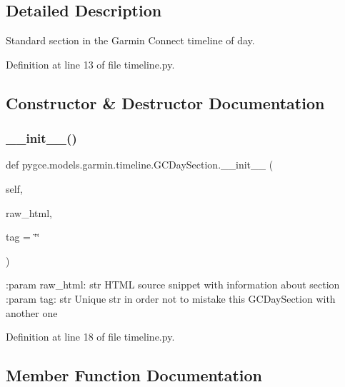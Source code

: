 \subsection{Detailed Description}
\begin{DoxyVerb}Standard section in the Garmin Connect timeline of day.
\end{DoxyVerb}
 

Definition at line 13 of file timeline.\+py.



\subsection{Constructor \& Destructor Documentation}
\mbox{\label{classpygce_1_1models_1_1garmin_1_1timeline_1_1_g_c_day_section_aae8c8c4a74381fa4ee47881ad498fb8f}} 
\subsubsection{\texorpdfstring{\+\_\+\+\_\+init\+\_\+\+\_\+()}{\_\_init\_\_()}}
{\footnotesize\ttfamily def pygce.\+models.\+garmin.\+timeline.\+G\+C\+Day\+Section.\+\_\+\+\_\+init\+\_\+\+\_\+ (\begin{DoxyParamCaption}\item[{}]{self,  }\item[{}]{raw\+\_\+html,  }\item[{}]{tag = {\ttfamily \char`\"{}\char`\"{}} }\end{DoxyParamCaption})}

\begin{DoxyVerb}:param raw_html: str
    HTML source snippet with information about section
:param tag: str
    Unique str in order not to mistake this GCDaySection with another one
\end{DoxyVerb}
 

Definition at line 18 of file timeline.\+py.



\subsection{Member Function Documentation}
\mbox{\label{classpygce_1_1models_1_1garmin_1_1timeline_1_1_g_c_day_section_ac1ddb2f5379e356e93166d1ea934b9c9}} 
